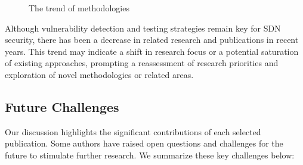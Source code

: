 \begin{figure}[ht!]
    \centering
    \begin{adjustbox}{width=\linewidth,center}
    \centering
         \end{adjustbox}

        \begin{adjustbox}{width=\linewidth,center}
        \end{adjustbox}
        
        \begin{adjustbox}{width=\linewidth,center}
        \end{adjustbox}

        \begin{adjustbox}{width=0.32\linewidth,center}
        \end{adjustbox}
    \caption{The trend of methodologies}
    \label{fig:trends_meth}
\end{figure}


Although vulnerability detection and testing strategies remain key for SDN security, there has been a decrease in related research and publications in recent years. This trend may indicate a shift in research focus or a potential saturation of existing approaches, prompting a reassessment of research priorities and exploration of novel methodologies or related areas.

\subsection{Future Challenges}
Our discussion highlights the significant contributions of each selected publication. Some authors have raised open questions and challenges for the future to stimulate further research. We summarize these key challenges below:
